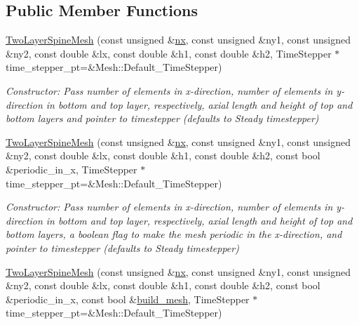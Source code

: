 \subsection*{Public Member Functions}
\begin{DoxyCompactItemize}
\item 
\hyperlink{classoomph_1_1TwoLayerSpineMesh_a0c41a93e9ccaaa34956215e64611be2a}{Two\+Layer\+Spine\+Mesh} (const unsigned \&\hyperlink{classoomph_1_1RectangularQuadMesh_abfef93d6322886cdce14a437186e4821}{nx}, const unsigned \&ny1, const unsigned \&ny2, const double \&lx, const double \&h1, const double \&h2, Time\+Stepper $\ast$time\+\_\+stepper\+\_\+pt=\&Mesh\+::\+Default\+\_\+\+Time\+Stepper)
\begin{DoxyCompactList}\small\item\em Constructor\+: Pass number of elements in x-\/direction, number of elements in y-\/direction in bottom and top layer, respectively, axial length and height of top and bottom layers and pointer to timestepper (defaults to Steady timestepper) \end{DoxyCompactList}\item 
\hyperlink{classoomph_1_1TwoLayerSpineMesh_a8787a305ee929d001542464529e23787}{Two\+Layer\+Spine\+Mesh} (const unsigned \&\hyperlink{classoomph_1_1RectangularQuadMesh_abfef93d6322886cdce14a437186e4821}{nx}, const unsigned \&ny1, const unsigned \&ny2, const double \&lx, const double \&h1, const double \&h2, const bool \&periodic\+\_\+in\+\_\+x, Time\+Stepper $\ast$time\+\_\+stepper\+\_\+pt=\&Mesh\+::\+Default\+\_\+\+Time\+Stepper)
\begin{DoxyCompactList}\small\item\em Constructor\+: Pass number of elements in x-\/direction, number of elements in y-\/direction in bottom and top layer, respectively, axial length and height of top and bottom layers, a boolean flag to make the mesh periodic in the x-\/direction, and pointer to timestepper (defaults to Steady timestepper) \end{DoxyCompactList}\item 
\hyperlink{classoomph_1_1TwoLayerSpineMesh_a374454978976c3873a89bedc688b983f}{Two\+Layer\+Spine\+Mesh} (const unsigned \&\hyperlink{classoomph_1_1RectangularQuadMesh_abfef93d6322886cdce14a437186e4821}{nx}, const unsigned \&ny1, const unsigned \&ny2, const double \&lx, const double \&h1, const double \&h2, const bool \&periodic\+\_\+in\+\_\+x, const bool \&\hyperlink{classoomph_1_1RectangularQuadMesh_afa579b413a2d8120e8228d840cb3582c}{build\+\_\+mesh}, Time\+Stepper $\ast$time\+\_\+stepper\+\_\+pt=\&Mesh\+::\+Default\+\_\+\+Time\+Stepper)

\end{DoxyCompactItemize}
